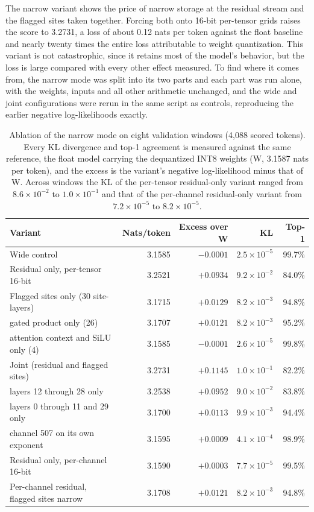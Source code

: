 \documentclass[11pt]{article}
\begin{document}
The narrow variant shows the price of narrow storage at the residual stream and the flagged sites taken together. Forcing both onto 16-bit per-tensor grids raises the score to 3.2731, a loss of about 0.12 nats per token against the float baseline and nearly twenty times the entire loss attributable to weight quantization. This variant is not catastrophic, since it retains most of the model's behavior, but the loss is large compared with every other effect measured. To find where it comes from, the narrow mode was split into its two parts and each part was run alone, with the weights, inputs and all other arithmetic unchanged, and the wide and joint configurations were rerun in the same script as controls, reproducing the earlier negative log-likelihoods exactly.

\begin{table}[h]
\centering
\footnotesize
\setlength{\tabcolsep}{4pt}
\begin{tabular}{lrrrr}
\toprule
Variant & Nats/token & Excess over W & KL & Top-1 \\
\midrule
Wide control & 3.1585 & $-0.0001$ & $2.5\times10^{-5}$ & 99.7\% \\
Residual only, per-tensor 16-bit & 3.2521 & $+0.0934$ & $9.2\times10^{-2}$ & 84.0\% \\
Flagged sites only (30 site-layers) & 3.1715 & $+0.0129$ & $8.2\times10^{-3}$ & 94.8\% \\
\quad gated product only (26) & 3.1707 & $+0.0121$ & $8.2\times10^{-3}$ & 95.2\% \\
\quad attention context and SiLU only (4) & 3.1585 & $-0.0001$ & $2.6\times10^{-5}$ & 99.8\% \\
Joint (residual and flagged sites) & 3.2731 & $+0.1145$ & $1.0\times10^{-1}$ & 82.2\% \\
\quad layers 12 through 28 only & 3.2538 & $+0.0952$ & $9.0\times10^{-2}$ & 83.8\% \\
\quad layers 0 through 11 and 29 only & 3.1700 & $+0.0113$ & $9.9\times10^{-3}$ & 94.4\% \\
\quad channel 507 on its own exponent & 3.1595 & $+0.0009$ & $4.1\times10^{-4}$ & 98.9\% \\
Residual only, per-channel 16-bit & 3.1590 & $+0.0003$ & $7.7\times10^{-5}$ & 99.5\% \\
Per-channel residual, flagged sites narrow & 3.1708 & $+0.0121$ & $8.2\times10^{-3}$ & 94.8\% \\
\bottomrule
\end{tabular}
\caption{Ablation of the narrow mode on eight validation windows (4,088 scored tokens). Every KL divergence and top-1 agreement is measured against the same reference, the float model carrying the dequantized INT8 weights (W, 3.1587 nats per token), and the excess is the variant's negative log-likelihood minus that of W. Across windows the KL of the per-tensor residual-only variant ranged from $8.6\times10^{-2}$ to $1.0\times10^{-1}$ and that of the per-channel residual-only variant from $7.2\times10^{-5}$ to $8.2\times10^{-5}$.}
\label{tab:ablation}
\end{table}
\end{document}
